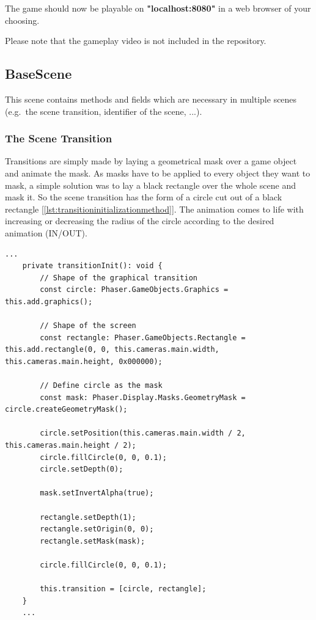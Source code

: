 The game should now be playable on \textbf{"localhost:8080"} in a web browser of your choosing.

Please note that the gameplay video is not included in the repository.

\subsection{BaseScene}\label{subsec:basescene}
This scene contains methods and fields which are necessary in multiple scenes
(e.g.\ the scene transition, identifier of the scene, ...).

\subsubsection{The Scene Transition}
Transitions are simply made by laying a geometrical mask over a game object and animate the mask.
As masks have to be applied to every object they want to mask,
a simple solution was to lay a black rectangle over the whole scene and mask it.
So the scene transition has the form of a circle cut out of a black rectangle [\ref{lst:transitioninitializationmethod}].
The animation comes to life with increasing or decreasing
the radius of the circle according to the desired animation (IN/OUT).

\begin{lstlisting}[style=TypeScript, caption={Transition Initialization Method (BaseScene.ts)}, label={lst:transitioninitializationmethod}]
    ...
    private transitionInit(): void {
        // Shape of the graphical transition
        const circle: Phaser.GameObjects.Graphics = this.add.graphics();

        // Shape of the screen
        const rectangle: Phaser.GameObjects.Rectangle = this.add.rectangle(0, 0, this.cameras.main.width, this.cameras.main.height, 0x000000);

        // Define circle as the mask
        const mask: Phaser.Display.Masks.GeometryMask = circle.createGeometryMask();

        circle.setPosition(this.cameras.main.width / 2, this.cameras.main.height / 2);
        circle.fillCircle(0, 0, 0.1);
        circle.setDepth(0);

        mask.setInvertAlpha(true);

        rectangle.setDepth(1);
        rectangle.setOrigin(0, 0);
        rectangle.setMask(mask);

        circle.fillCircle(0, 0, 0.1);

        this.transition = [circle, rectangle];
    }
    ...
\end{lstlisting}

